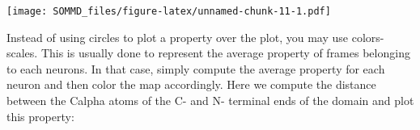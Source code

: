 \documentclass[
]{article}
\newenvironment{Shaded}{\begin{snugshade}}{\end{snugshade}}
\newcommand{\AttributeTok}[1]{\textcolor[rgb]{0.77,0.63,0.00}{#1}}
\newcommand{\CommentTok}[1]{\textcolor[rgb]{0.56,0.35,0.01}{\textit{#1}}}
\newcommand{\ConstantTok}[1]{\textcolor[rgb]{0.00,0.00,0.00}{#1}}
\newcommand{\ControlFlowTok}[1]{\textcolor[rgb]{0.13,0.29,0.53}{\textbf{#1}}}
\newcommand{\DecValTok}[1]{\textcolor[rgb]{0.00,0.00,0.81}{#1}}
\newcommand{\FloatTok}[1]{\textcolor[rgb]{0.00,0.00,0.81}{#1}}
\newcommand{\FunctionTok}[1]{\textcolor[rgb]{0.00,0.00,0.00}{#1}}
\newcommand{\NormalTok}[1]{#1}
\newcommand{\OtherTok}[1]{\textcolor[rgb]{0.56,0.35,0.01}{#1}}
\newcommand{\SpecialCharTok}[1]{\textcolor[rgb]{0.00,0.00,0.00}{#1}}
\newcommand{\StringTok}[1]{\textcolor[rgb]{0.31,0.60,0.02}{#1}}
\begin{document}
\begin{Shaded}
\end{Shaded}

\texttt{[image: SOMMD\_files/figure-latex/unnamed-chunk-11-1.pdf]}

Instead of using circles to plot a property over the plot, you may use
colors-scales. This is usually done to represent the average property of
frames belonging to each neurons. In that case, simply compute the
average property for each neuron and then color the map accordingly.
Here we compute the distance between the Calpha atoms of the C- and N-
terminal ends of the domain and plot this property:
\end{document}
